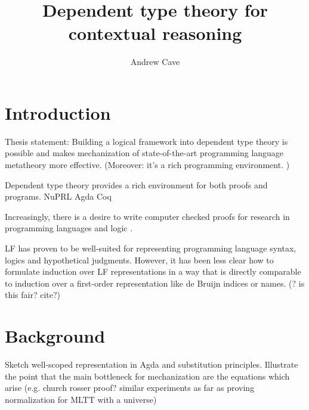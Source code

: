 \documentclass{article}
\author{Andrew Cave}
\title{Dependent type theory for contextual reasoning}
\begin{document}
\maketitle

\section{Introduction}
Thesis statement: Building a logical framework into dependent type
theory is possible and makes mechanization of state-of-the-art programming
language metatheory more effective. (Moreover: it's a rich programming
environment. %
)

Dependent type theory provides a rich environment for both proofs and
programs. \cite{Martin-Loef73a}
NuPRL \citep{NuPRL} Agda \citep{Norell:phd07} Coq
\citep{bertot/casteran:2004}

Increasingly, there is a desire to write computer checked proofs for
research in programming languages and logic \citep{POPLMark}.

LF \citep{Harper93jacm} has proven to be well-suited for representing
programming language syntax, logics and hypothetical
judgments. However, it has been less clear how to formulate induction
over LF representations in a way that is directly comparable to
induction over a first-order representation like de Bruijn indices or
names. (? is this fair? cite?)

\section{Background}
Sketch well-scoped representation in Agda and substitution
principles. Illustrate the point that the main bottleneck for
mechanization are the equations which arise (e.g. church rosser proof?
similar experiments as far as proving normalization for MLTT with a universe)
\end{document}
